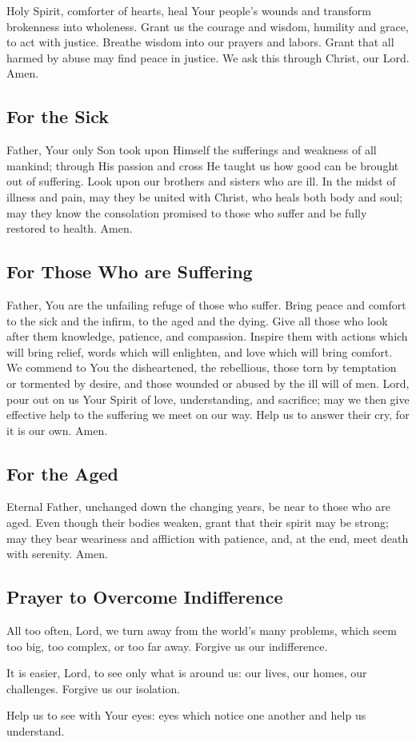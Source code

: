 \documentclass[12pt]{article}
\newcommand{\prayertitle}[1]{\subsection{#1}}
\begin{document}
Holy Spirit, comforter of hearts, heal Your people's wounds and transform brokenness into wholeness.
Grant us the courage and wisdom, humility and grace, to act with justice.
Breathe wisdom into our prayers and labors.
Grant that all harmed by abuse may find peace in justice.
We ask this through Christ, our Lord. Amen.

\prayertitle{For the Sick}
Father, Your only Son took upon Himself the sufferings and weakness of all mankind; through His passion and cross He taught us how good can be brought out of suffering.
Look upon our brothers and sisters who are ill.
In the midst of illness and pain, may they be united with Christ, who heals both body and soul; may they know the consolation promised to those who suffer and be fully restored to health.
Amen.

\prayertitle{For Those Who are Suffering}
Father, You are the unfailing refuge of those who suffer.
Bring peace and comfort to the sick and the infirm, to the aged and the dying.
Give all those who look after them knowledge, patience, and compassion.
Inspire them with actions which will bring relief, words which will enlighten, and love which will bring comfort.
We commend to You the disheartened, the rebellious, those torn by temptation or tormented by desire, and those wounded or abused by the ill will of men.
Lord, pour out on us Your Spirit of love, understanding, and sacrifice; may we then give effective help to the suffering we meet on our way.
Help us to answer their cry, for it is our own.
Amen.

\prayertitle{For the Aged}
Eternal Father, unchanged down the changing years, be near to those who are aged.
Even though their bodies weaken, grant that their spirit may be strong; may they bear weariness and affliction with patience, and, at the end, meet death with serenity.
Amen.

\prayertitle{Prayer to Overcome Indifference}
All too often, Lord, we turn away from the world's many problems, which seem too big, too complex, or too far away.
Forgive us our indifference.

It is easier, Lord, to see only what is around us:
our lives, our homes, our challenges.
Forgive us our isolation.

Help us to see with Your eyes:
eyes which notice one another and help us understand.
\end{document}
